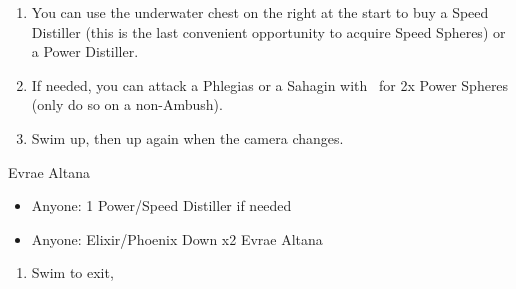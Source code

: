\begin{enumerate}[resume]
    \item You can use the underwater chest on the right at the start to buy a Speed Distiller (this is the last convenient opportunity to acquire Speed Spheres) or a Power Distiller.
    \item If needed, you can attack a Phlegias or a Sahagin with \tidus\ for 2x Power Spheres (only do so on a non-Ambush).
    \item Swim up, then up again when the camera changes. 
\end{enumerate}
\begin{battle}{Evrae Altana}
    \begin{itemize}
        \item Anyone: 1 Power/Speed Distiller if needed
        \item Anyone: Elixir/Phoenix Down x2 Evrae Altana
    \end{itemize}
\end{battle}
\begin{enumerate}[resume]
    \item Swim to exit, \sd
\end{enumerate}
\bothnp\bothnpsingle
